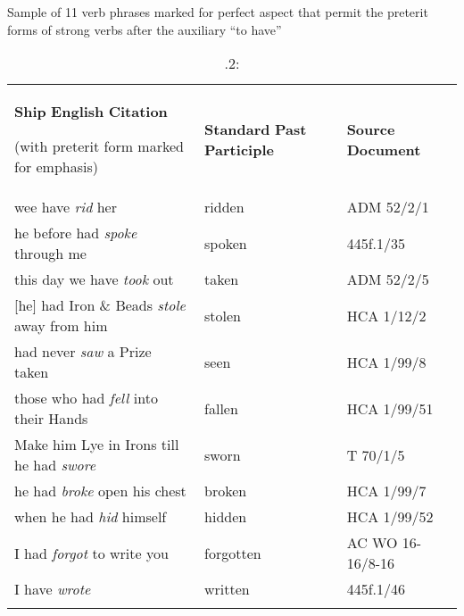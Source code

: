 \begin{table}
\caption{\label{tab:key:6}.2:} Sample of 11 verb phrases marked for perfect aspect that permit the preterit forms of strong verbs after the auxiliary “to have”

\begin{tabularx}{\textwidth}{XXX}
\lsptoprule

\textbf{Ship} \textbf{English} \textbf{Citation} 

(with preterit form marked for emphasis) & \textbf{Standard} \textbf{Past} \textbf{Participle} & \textbf{Source} \textbf{Document}\\
wee have \textit{rid} her & ridden & ADM 52/2/1\\
he before had \textit{spoke} through me & spoken & 445f.1/35\\
this day we have \textit{took} out & taken & ADM 52/2/5\\{}
[he] had Iron \& Beads \textit{stole} away from him & stolen & HCA 1/12/2\\
had never \textit{saw} a Prize taken & seen & HCA 1/99/8\\
those who had \textit{fell} into their Hands & fallen & HCA 1/99/51\\
Make him Lye in Irons till he had \textit{swore} & sworn & T 70/1/5\\
he had \textit{broke} open his chest & broken & HCA 1/99/7\\
when he had \textit{hid} himself & hidden & HCA 1/99/52\\
I had \textit{forgot} to write you & forgotten & AC WO 16-16/8-16\\
I have \textit{wrote} & written & 445f.1/46\\
\lspbottomrule
\end{tabularx}\end{table}

